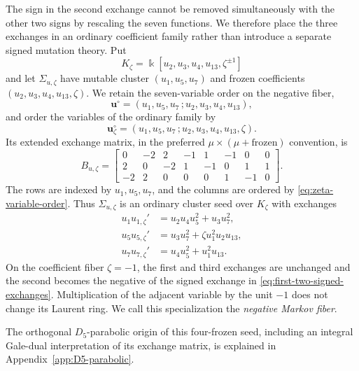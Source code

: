\documentclass[11pt,reqno]{amsart}
\numberwithin{equation}{section}
\theoremstyle{remark}
\newcommand{\kk}{\Bbbk}
\begin{document}
The sign in the second exchange cannot be removed simultaneously with the
other two signs by rescaling the seven functions.  We therefore place the
three exchanges in an ordinary coefficient family rather than introduce a
separate signed mutation theory.  Put
\[ K_\zeta=\kk[u_2,u_3,u_4,u_{13},\zeta^{\pm1}] \]
and let $\Sigma_{u,\zeta}$ have mutable cluster $(u_1,u_5,u_7)$
and frozen coefficients $(u_2,u_3,u_4,u_{13},\zeta)$.  We retain the
seven-variable order on the negative fiber,
\begin{equation}
\label{eq:markov-variable-order}
 \mathbf u^\circ=(u_1,u_5,u_7\,;u_2,u_3,u_4,u_{13}),
\end{equation}
and order the variables of the ordinary family by
\begin{equation}
\label{eq:zeta-variable-order}
 \mathbf u_\zeta^\circ
 =(u_1,u_5,u_7\,;u_2,u_3,u_4,u_{13},\zeta).
\end{equation}
Its extended exchange matrix, in the preferred
$\mu\times(\mu+\mathrm{frozen})$ convention, is
\begin{equation*}
 B_{u,\zeta}=
 \begin{bmatrix}
  0&-2& 2&-1& 1&-1& 0&0\\
  2& 0&-2& 1&-1& 0& 1&1\\
 -2& 2& 0& 0& 0& 1&-1&0
 \end{bmatrix}.
\end{equation*}
The rows are indexed by $u_1,u_5,u_7$, and the columns are ordered by
\eqref{eq:zeta-variable-order}.  Thus $\Sigma_{u,\zeta}$ is an ordinary
cluster seed over $K_\zeta$ with exchanges
\begin{equation}
\label{eq:zeta-family-exchanges}
 \begin{aligned}
 u_1u_{1,\zeta}'&=u_2u_4u_5^2+u_3u_7^2,\\
 u_5u_{5,\zeta}'&=u_3u_7^2+\zeta u_1^2u_2u_{13},\\
 u_7u_{7,\zeta}'&=u_4u_5^2+u_1^2u_{13}.
 \end{aligned}
\end{equation}
On the coefficient fiber $\zeta=-1$, the first and third exchanges are
unchanged and the second becomes the negative of the signed exchange in
\eqref{eq:first-two-signed-exchanges}.  Multiplication of the adjacent
variable by the unit $-1$ does not change its Laurent ring.  We call this
specialization the \emph{negative Markov fiber}.


The orthogonal $D_5$-parabolic origin of this four-frozen seed, including
an integral Gale-dual interpretation of its exchange matrix, is explained in
Appendix~\ref{app:D5-parabolic}.
\end{document}
